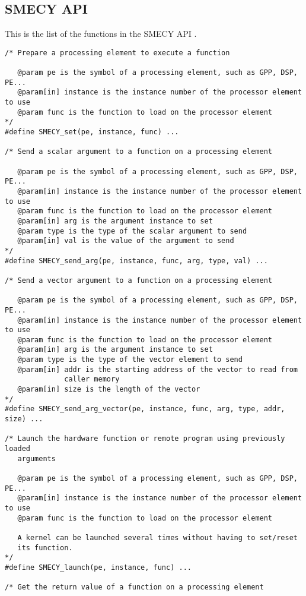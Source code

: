 \documentclass[a4paper]{article}
\begin{document}
	\subsection{SMECY API}
	This is the list of the functions in the SMECY API \cite{smec}.
	\begin{lstlisting}[frame=none,numbers=none]
/* Prepare a processing element to execute a function

   @param pe is the symbol of a processing element, such as GPP, DSP, PE...
   @param[in] instance is the instance number of the processor element to use
   @param func is the function to load on the processor element
*/
#define SMECY_set(pe, instance, func) ...

/* Send a scalar argument to a function on a processing element

   @param pe is the symbol of a processing element, such as GPP, DSP, PE...
   @param[in] instance is the instance number of the processor element to use
   @param func is the function to load on the processor element
   @param[in] arg is the argument instance to set
   @param type is the type of the scalar argument to send
   @param[in] val is the value of the argument to send
*/
#define SMECY_send_arg(pe, instance, func, arg, type, val) ...

/* Send a vector argument to a function on a processing element

   @param pe is the symbol of a processing element, such as GPP, DSP, PE...
   @param[in] instance is the instance number of the processor element to use
   @param func is the function to load on the processor element
   @param[in] arg is the argument instance to set
   @param type is the type of the vector element to send
   @param[in] addr is the starting address of the vector to read from
              caller memory
   @param[in] size is the length of the vector
*/
#define SMECY_send_arg_vector(pe, instance, func, arg, type, addr, size) ...

/* Launch the hardware function or remote program using previously loaded
   arguments

   @param pe is the symbol of a processing element, such as GPP, DSP, PE...
   @param[in] instance is the instance number of the processor element to use
   @param func is the function to load on the processor element

   A kernel can be launched several times without having to set/reset
   its function.
*/
#define SMECY_launch(pe, instance, func) ...

/* Get the return value of a function on a processing element


\end{lstlisting}
\end{document}
